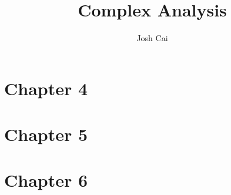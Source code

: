 \documentclass{article}
\begin{document}
\title{Complex Analysis}
\author{Josh Cai}

\maketitle  

\section{Chapter 4}


\section{Chapter 5}


\section{Chapter 6}

\end{document}
